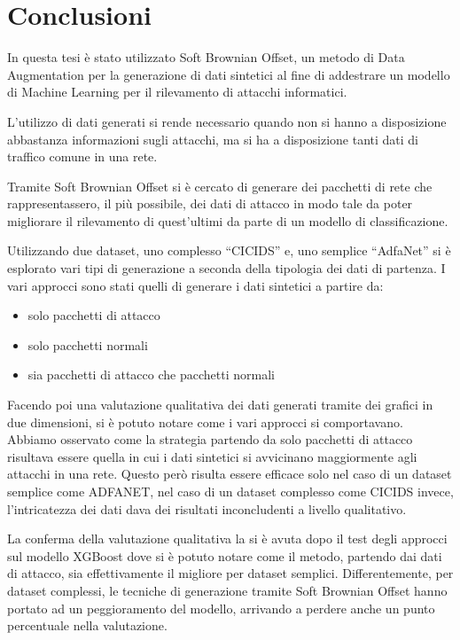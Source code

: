\chapter{Conclusioni}

In questa tesi è stato utilizzato Soft Brownian Offset, un metodo di Data Augmentation per la generazione di dati sintetici al fine di addestrare un modello di Machine Learning per il rilevamento di attacchi informatici. 

L'utilizzo di dati generati si rende necessario quando non si hanno a disposizione abbastanza informazioni sugli attacchi, ma si ha a disposizione tanti dati di traffico comune in una rete. 

Tramite Soft Brownian Offset si è cercato di generare dei pacchetti di rete che rappresentassero, il più possibile, dei dati di attacco in modo tale da poter migliorare il rilevamento di quest'ultimi da parte di un modello di classificazione.

Utilizzando due dataset, uno complesso ``CICIDS'' e, uno semplice ``AdfaNet'' si è esplorato vari tipi di generazione a seconda della tipologia dei dati di partenza. I vari approcci sono stati quelli di generare i dati sintetici a partire da:

\begin{itemize}
  \item solo pacchetti di attacco
  \item solo pacchetti normali
  \item sia pacchetti di attacco che pacchetti normali
\end{itemize}

Facendo poi una valutazione qualitativa dei dati generati tramite dei grafici in due dimensioni, si è potuto notare come i vari approcci si comportavano. Abbiamo osservato come la strategia partendo da solo pacchetti di attacco risultava essere quella in cui i dati sintetici si avvicinano maggiormente agli attacchi in una rete. Questo però risulta essere efficace solo nel caso di un dataset semplice come ADFANET, nel caso di un dataset complesso come CICIDS invece, l'intricatezza dei dati dava dei risultati inconcludenti a livello qualitativo.

La conferma della valutazione qualitativa la si è avuta dopo il test degli approcci sul modello XGBoost dove si è potuto notare come il metodo, partendo dai dati di attacco, sia effettivamente il migliore per dataset semplici.
Differentemente, per dataset complessi, le tecniche di generazione tramite Soft Brownian Offset hanno portato ad un peggioramento del modello, arrivando a perdere anche un punto percentuale nella valutazione.


